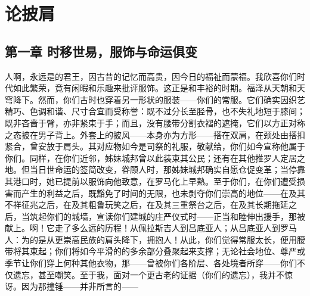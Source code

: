 
\chapter{论披肩}



\section{第一章  时移世易，服饰与命运俱变}

人啊，永远是的君王，因古昔的记忆而高贵，因今日的福祉而蒙福。我欣喜你们时代如此繁荣，竟有闲暇和乐趣来批评服饰。这正是和丰裕的时期。福泽从天朝和天穹降下。然而，你们古时也穿着另一形状的服装——你们的常服。它们确实因织艺精巧、色调和谐、尺寸合宜而受称誉：既不过分长至胫骨，也不失礼地短于膝间；既非吝啬于臂，亦非紧束于手；而且，没有腰带分割衣褶的遮掩，它们以方正对称之态披在男子背上。外套上的披风——本身亦为方形——搭在双肩，在颈处由搭扣紧合，曾安放于肩头。其对应物如今是司祭的礼服，敬献给，你们如今宣称他属于你们。同样，在你们近邻，姊妹城邦曾以此装束其公民；还有在其他推罗人定居之地。但当日世命运的签简改变，眷顾人时，那姊妹城邦确实自愿仓促变革；当停靠其港口时，她已提前以服饰向他致意，在罗马化上早熟。至于你们，在你们遭受损害而产生的利益之后，既豁免了时间的无限，也未剥夺你们崇高的地位——在及其不祥征兆之后，在及其粗鲁玩笑之后，在及其三重祭台之后，在及其长期拖延之后，当筑起你们的城墙，宣读你们建城的庄严仪式时——正当和睦伸出援手，那被献上。啊！它走了多么远的历程！从佩拉斯吉人到吕底亚人；从吕底亚人到罗马人：为的是从更崇高民族的肩头降下，拥抱人！从此，你们觉得常服太长，便用腰带将其束起；你们将如今平滑的的多余部分叠聚起来支撑；无论社会地位、尊严或季节让你们穿上何种其他衣物，那——曾被你们各阶层、各处境者所穿——你们不仅遗忘，甚至嘲笑。至于我，面对一个更古老的证据（你们的遗忘），我并不惊讶。因为那撞锤——并非所言的——\par

\par

